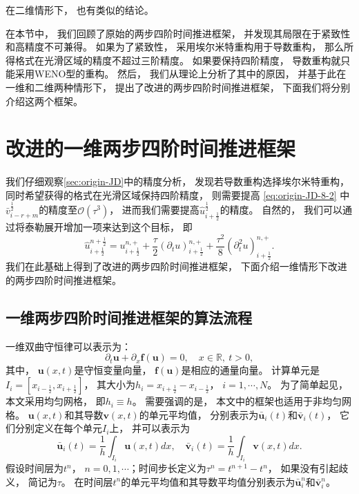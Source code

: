 在二维情形下，
也有类似的结论。

\vspace{\baselineskip} %
在本节中，
我们回顾了原始的两步四阶时间推进框架，
并发现其局限在于紧致性和高精度不可兼得。
如果为了紧致性，
采用埃尔米特重构用于导数重构，
那么所得格式在光滑区域的精度不超过三阶精度。
如果要保持四阶精度，
导数重构就只能采用WENO型的重构。
然后，
我们从理论上分析了其中的原因，
并基于此在一维和二维两种情形下，
提出了改进的两步四阶时间推进框架，
下面我们将分别介绍这两个框架。

\section{改进的一维两步四阶时间推进框架}
\label{sec:1D-S2O4}

我们仔细观察\cref{sec:origin-JD}中的精度分析，
发现若导数重构选择埃尔米特重构，
同时希望获得的格式在光滑区域保持四阶精度，
则需要提高 \cref{eq:origin-JD-8-2} 中$\bar v_{i-r+m}^{\frac 12}$的精度至$\mathcal{O}(\tau^3)$，
进而我们需要提高$\hat {u}^{\frac 12}_{i+\frac 12}$的精度。
自然的，
我们可以通过将泰勒展开增加一项来达到这个目标，
即
\begin{equation}
  \hat u_{i+\frac{1}{2}}^{n+\frac 12}=u_{i+\frac{1}{2}}^{n, +}+\frac{\tau}{2} \left({\partial_{t}}u\right)_{i+\frac{1}{2}}^{n, +}+\frac{\tau^2}{8} \left({\partial_{t}^2}{u}\right)_{i+\frac{1}{2}}^{n, +}.
\end{equation}
我们在此基础上得到了改进的两步四阶时间推进框架，
下面介绍一维情形下改进的两步四阶时间推进框架。

\subsection{一维两步四阶时间推进框架的算法流程}
\label{sec:1D-framework}

一维双曲守恒律可以表示为：
\begin{equation}
  \label{eq:1D-law}
  {\partial_{t}}{\bm{u}} + {\partial_{x}}{\bm{f}}({\bm{u}}) = 0, \quad x \in \mathbb{R},~t>0,
\end{equation}
其中，
${\bm{u}}(x,t)$是守恒变量向量，
${\bm{f}}({\bm{u}})$是相应的通量向量。
计算单元是$I_{i}=[x_{i-\frac 12},x_{i+\frac 12}]$，
其大小为$h_i=x_{i+\frac 12}-x_{i-\frac 12}$，
$i=1,\cdots, N$。
为了简单起见，
本文采用均匀网格，
即$h_i\equiv h$。
需要强调的是，
本文中的框架也适用于非均匀网格。
${\bm{u}}(x,t)$和其导数${\bm{v}}(x,t)$的单元平均值，
分别表示为$\bar{\bm{u}}_{i}(t)$和$\bar{\bm{v}}_{i}(t)$，
它们分别定义在每个单元$I_{i}$上，
并可以表示为
\begin{equation}
  \label{eq:1D-average}
  \bar{\bm{u}}_{i}(t)=\frac{1}{h}\int_{I_{i}} {\bm{u}}(x,t) dx, \quad
  \bar{\bm{v}}_{i}(t)=\frac{1}{h}\int_{I_{i}} {\bm{v}}(x,t) dx.
\end{equation}
假设时间层为$t^n$，
$n=0,1,\cdots$；时间步长定义为$\tau^n = t^{n+1} - t^{n}$，
如果没有引起歧义，
简记为$\tau$。
在时间层$t^n$的单元平均值和其导数平均值分别表示为$\bar{\bm{u}}_{i}^n$和$\bar{\bm{v}}_{i}^n$。

